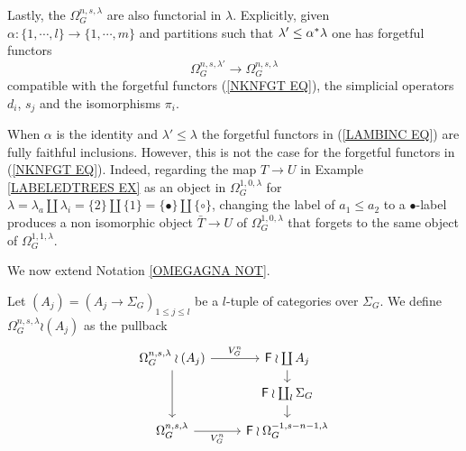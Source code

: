 \documentclass[a4paper,10pt]{article}%
\begin{document}
Lastly, the $\Omega_G^{n,s,\lambda}$ are also functorial in $\lambda$. Explicitly, given 
$\alpha \colon \{1,\cdots,l\} \to \{1,\cdots,m\}$
and partitions such that 
$\lambda' \leq \alpha^{\**} \lambda$
one has forgetful functors
\begin{equation}\label{LAMBINC EQ}
	\Omega_G^{n,s,\lambda'}
\to
	\Omega_G^{n,s,\lambda}
\end{equation}
compatible with the forgetful functors (\ref{NKNFGT EQ}),
the simplicial operators $d_i$, $s_j$ and the isomorphisms
$\pi_i$.

\begin{remark}
	When $\alpha$ is the identity 
and $\lambda' \leq \lambda$ the forgetful functors in
(\ref{LAMBINC EQ}) are fully faithful inclusions.
	However, this is not the case for the  forgetful functors in (\ref{NKNFGT EQ}).
	Indeed, regarding the map $T \to U$ in
	Example \ref{LABELEDTREES EX}
	as an object in $\Omega_G^{1,0,\lambda}$
	for $\lambda = 
	\lambda_a \amalg \lambda_i = \{2\} \amalg \{1\}
	=\{\bullet\} \amalg \{\circ\}$,
	changing the label of $a_1 \leq a_2$ to a 
	$\bullet$-label produces a non isomorphic object
	$\bar{T} \to U$ of $\Omega_G^{1,0,\lambda}$
	that forgets to the same object of 
	$\Omega_G^{1,1,\lambda}$.
\end{remark}


We now extend Notation \ref{OMEGAGNA NOT}.

\begin{notation}
Let $(A_j)=(A_j \to \Sigma_G)_{1\leq j \leq l}$ be a $l$-tuple of categories over $\Sigma_G$.
We define 
$\Omega_{G}^{n,s,\lambda} \wr (A_j) $
as the pullback
\begin{equation}\label{OMEGAWRTUP EQ}
\begin{tikzcd}[row sep=1em]
	\Omega_{G}^{n,s,\lambda} \wr (A_j) \ar{r}{V_{G}^{n}} \ar{dd}& 
	\Fin \wr \coprod A_j \ar{d}
\\
	& \Fin \wr \coprod_l \Sigma_G \ar{d}
\\
	\Omega_{G}^{n,s,\lambda} \ar{r}[swap]{V_{G}^{n}} &
	\Fin \wr \Omega_G^{-1,s-n-1,\lambda}
\end{tikzcd}
\end{equation}
\end{notation}
\end{document}
